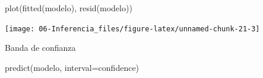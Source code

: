 \documentclass[
]{book}
\newenvironment{Shaded}{\begin{snugshade}}{\end{snugshade}}
\newcommand{\AttributeTok}[1]{\textcolor[rgb]{0.77,0.63,0.00}{#1}}
\newcommand{\FunctionTok}[1]{\textcolor[rgb]{0.00,0.00,0.00}{#1}}
\newcommand{\NormalTok}[1]{#1}
\newcommand{\StringTok}[1]{\textcolor[rgb]{0.31,0.60,0.02}{#1}}
\theoremstyle{break}
\theoremstyle{nonumberplain}
\begin{document}
\begin{Shaded}
\begin{Highlighting}[]
\FunctionTok{plot}\NormalTok{(}\FunctionTok{fitted}\NormalTok{(modelo), }\FunctionTok{resid}\NormalTok{(modelo))}
\end{Highlighting}
\end{Shaded}

\begin{center}\texttt{[image: 06-Inferencia\_files/figure-latex/unnamed-chunk-21-3]} \end{center}

Banda de confianza

\begin{Shaded}
\begin{Highlighting}[]
\FunctionTok{predict}\NormalTok{(modelo, }\AttributeTok{interval=}\StringTok{\textquotesingle{}confidence\textquotesingle{}}\NormalTok{)}
\end{Highlighting}
\end{Shaded}
\end{document}
